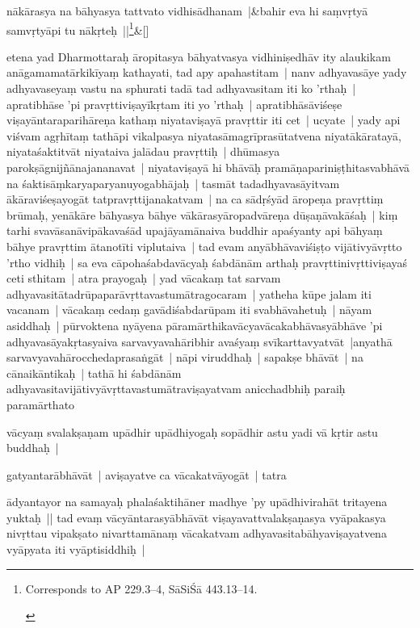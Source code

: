 \documentclass[article,12pt,a4paper]{memoir}
\newcommand{\persName}[1]{#1}
\begin{document}
	    
	    \stanza[\smallbreak]
	\label{thakur75-65.21}nākārasya na bāhyasya tattvato vidhisādhanam |&bahir eva hi saṃvṛtyā samvṛtyāpi tu nākṛteḥ ||\footnote{\begin{english}Corresponds to AP 229.3–4, SāSiŚā 443.13–14.\end{english}}\&[\smallbreak]


	

	  \pstart etena yad \persName{Dharmottaraḥ} āropitasya bāhyatvasya vidhiniṣedhāv ity alaukikam anāgamamatārkikīyaṃ kathayati, tad apy apahastitam | \label{thakur75-65.26} nanv adhyavasāye yady adhyavaseyaṃ vastu na sphurati tadā tad adhyavasitam iti ko 'rthaḥ | apratibhāse 'pi pravṛttiviṣayīkṛtam iti yo 'rthaḥ | apratibhāsāviśeṣe viṣayāntaraparihāreṇa kathaṃ niyataviṣayā pravṛttir iti cet | ucyate | yady api viśvam agṛhītaṃ tathāpi vikalpasya niyatasāmagrīprasūtatvena niyatākāratayā, niyataśaktitvāt niyataiva jalādau pravṛttiḥ | dhūmasya parokṣāgnijñānajananavat | \label{thakur75-66.1} niyataviṣayā hi bhāvāḥ pramāṇapariniṣṭhitasvabhāvā na śaktisāṃkaryaparyanuyogabhājaḥ | tasmāt tadadhyavasāyitvam ākāraviśeṣayogāt tatpravṛttijanakatvam | na ca sādṛśyād āropeṇa pravṛttiṃ brūmaḥ, yenākāre bāhyasya bāhye vākārasyāropadvāreṇa dūṣaṇāvakāśaḥ | kiṃ tarhi svavāsanāvipākavaśād upajāyamānaiva buddhir apaśyanty api bāhyaṃ bāhye pravṛttim ātanotīti viplutaiva | tad evam anyābhāvaviśiṣṭo vijātivyāvṛtto 'rtho vidhiḥ | sa eva cāpohaśabdavācyaḥ śabdānām arthaḥ pravṛttinivṛttiviṣayaś ceti sthitam | \label{thakur75-66.8} atra prayogaḥ | yad vācakaṃ tat sarvam adhyavasitātadrūpaparāvṛttavastumātragocaram | yatheha kūpe jalam iti vacanam | vācakaṃ cedaṃ gavādiśabdarūpam iti svabhāvahetuḥ | nāyam asiddhaḥ | pūrvoktena nyāyena pāramārthikavācyavācakabhāvasyābhāve 'pi adhyavasāyakṛtasyaiva sarvavyavahāribhir avaśyaṃ svīkarttavyatvāt |anyathā sarvavyavahārocchedaprasaṅgāt | nāpi viruddhaḥ | sapakṣe bhāvāt | na cānaikāntikaḥ | tathā hi śabdānām adhyavasitavijātivyāvṛttavastumātraviṣayatvam anicchadbhiḥ paraiḥ paramārthato
	\pend
      

	  \pstart vācyaṃ svalakṣaṇam upādhir upādhiyogaḥ sopādhir astu yadi vā kṛtir astu buddhaḥ |
	\pend
      

	  \pstart gatyantarābhāvāt | aviṣayatve ca vācakatvāyogāt | tatra
	\pend
      

	  \pstart ādyantayor na samayaḥ phalaśaktihāner madhye 'py upādhivirahāt tritayena yuktaḥ || \label{thakur75-66.19} tad evaṃ vācyāntarasyābhāvāt viṣayavattvalakṣaṇasya vyāpakasya nivṛttau vipakṣato nivarttamānaṃ vācakatvam adhyavasitabāhyaviṣayatvena vyāpyata iti vyāptisiddhiḥ |
	\pend
      
\end{document}

